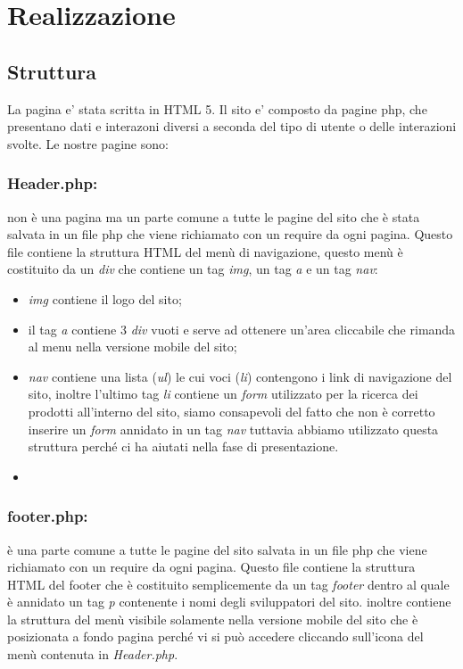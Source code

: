 \section{Realizzazione}
\subsection{Struttura}
La pagina e' stata scritta in HTML 5.\newline
Il sito e' composto da pagine php, che presentano dati e interazoni diversi a seconda del tipo di utente o delle interazioni svolte.
Le nostre pagine sono:

	
 \subsubsection{Header.php:}\Spazio non è una pagina ma un parte comune a tutte le pagine del sito che è stata salvata in un file php che viene richiamato con un require da ogni pagina. Questo file contiene la struttura HTML del menù di navigazione, questo menù è costituito da un \emph{div} che contiene un tag \emph{img}, un tag \emph{a} e un tag \emph{nav}:
 \begin{itemize}
 	\item \emph{img} contiene il logo del sito;
 	\item il tag \emph{a} contiene 3 \emph{div} vuoti e serve ad ottenere un'area cliccabile che rimanda al menu nella versione mobile del sito; 
 	\item \emph{nav} contiene una lista (\emph{ul}) le cui voci (\emph{li}) contengono i link di navigazione del sito, inoltre l'ultimo tag \emph{li} contiene un \emph{form} utilizzato per la ricerca dei prodotti all'interno del sito, siamo consapevoli del fatto che non è corretto inserire un \emph{form} annidato in un tag \emph{nav} tuttavia abbiamo utilizzato questa struttura perché ci ha aiutati nella fase di presentazione.
 	\item 
 \end{itemize}


 \subsubsection{footer.php:} \Spazio è una parte comune a tutte le pagine del sito salvata in un file php che viene richiamato con un require da ogni pagina.
 Questo file contiene la struttura HTML del footer che è costituito semplicemente da un tag \emph{footer} dentro al quale è annidato un tag \emph{p} contenente i nomi degli sviluppatori del sito. 
 inoltre contiene la struttura del menù visibile solamente nella versione mobile del sito che è posizionata a fondo pagina perché vi si può accedere cliccando sull'icona del menù contenuta in \emph{Header.php}.
	

